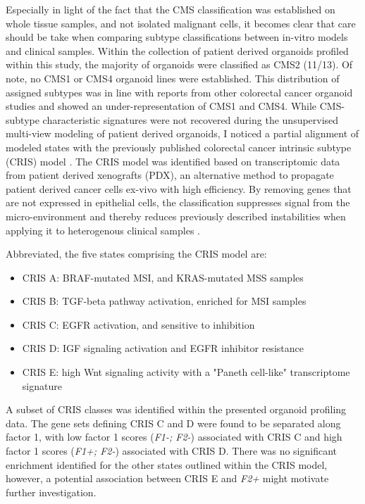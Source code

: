 \begin{flushleft}
Especially in light of the fact that the CMS classification was established on whole tissue samples, and not isolated malignant cells, it becomes clear that care should be take when comparing subtype classifications between in-vitro models and clinical samples. Within the collection of patient derived organoids profiled within this study, the majority of organoids were classified as CMS2 (11/13). Of note, no CMS1 or CMS4 organoid lines were established. This distribution of assigned subtypes was in line with reports from other colorectal cancer organoid studies \citep{vandeweteringProspectiveDerivationLiving2015, schutteMolecularDissectionColorectal2017} and showed an under-representation of CMS1 and CMS4. While CMS-subtype characteristic signatures were not recovered during the unsupervised multi-view modeling of patient derived organoids, I noticed a partial alignment of modeled states with the previously published colorectal cancer intrinsic subtype (CRIS) model \citep{isellaSelectiveAnalysisCancercell2017a}. The CRIS model was identified based on transcriptomic data from patient derived xenografts (PDX), an alternative method to propagate patient derived cancer cells ex-vivo with high efficiency. By removing genes that are not expressed in epithelial cells, the classification suppresses signal from the micro-environment and thereby reduces previously described instabilities when applying it to heterogenous clinical samples \citep{dunneCancercellIntrinsicGene2017}.
\par

Abbreviated, the five states comprising the CRIS model are: 
\begin{itemize} 
    \item CRIS A: BRAF-mutated MSI, and KRAS-mutated MSS samples
    \item CRIS B: TGF-beta pathway activation, enriched for MSI samples 
    \item CRIS C: EGFR activation, and sensitive to inhibition
    \item CRIS D: IGF signaling activation and EGFR inhibitor resistance
    \item CRIS E: high Wnt signaling activity with a "Paneth cell-like" transcriptome signature
\end{itemize}

A subset of CRIS classes was identified within the presented organoid profiling data. The gene sets defining CRIS C and D were found to be separated along factor 1, with low factor 1 scores (\textit{F1-; F2-}) associated with CRIS C and high factor 1 scores (\textit{F1+; F2-}) associated with CRIS D. There was no significant enrichment identified for the other states outlined within the CRIS model, however, a potential association between CRIS E and \textit{F2+} might motivate further investigation.
\par


\end{flushleft}
